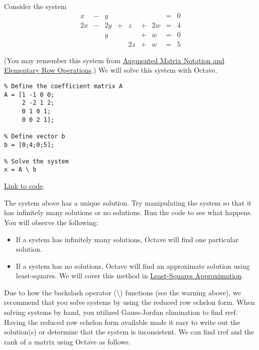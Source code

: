 \documentclass{ximera}
\begin{document}
\begin{template}\label{temp:systems1}
Consider the system
\begin{equation}
\begin{array}{ccccccccc}
      x &- &y&&&&&= &0 \\
	 2x& -&2y&+&z&+&2w&=&4\\
     & &y&&&+&w&=&0\\
     & &&&2z&+&w&=&5
    \end{array}
    \end{equation}

 (You may remember this system from \href{https://ximera.osu.edu/linearalgebrav3/LinearAlgebraInteractiveIntro/SYS-0020/main}{Augmented Matrix Notation and Elementary Row Operations}.)  We will solve this system with Octave.   
\begin{verbatim}
% Define the coefficient matrix A
A = [1 -1 0 0;
     2 -2 1 2;
     0 1 0 1;
     0 0 2 1];

% Define vector b
b = [0;4;0;5];

% Solve the system 
x = A \ b
\end{verbatim}

\href{https://sagecell.sagemath.org/?z=eJxFjsEKwjAQRO-B_Ye59FjYBD0FDwH_wGP1YMIGA7aBNpT69yZIcG-PeczsgKvEtAjKSxCyxJhCkqVgfpY1HXCkHC6YNEYNBltSaGcwGmiYzowW6z9yVfSjMqmhb-wSSl7hSfnWyfZk2Z67dMvv_ffH9tmKzCB1VM3hDv8FLh8nkA==&lang=octave&interacts=eJyLjgUAARUAuQ==}{Link to code}.

\begin{warning}
    The system above has a unique solution.  Try manipulating the system so that it has infinitely many solutions or no solutions.  Run the code to see what happens.  You will observe the following:

\begin{itemize}
    \item If a system has infinitely many solutions, Octave will find one particular solution.
    \item If a system has no solutions, Octave will find an approximate solution using least-squares.  We will cover this method in \href{https://ximera.osu.edu/linearalgebrav3/LinearAlgebraInteractiveIntro/RTH-0030/main}{Least-Squares Approximation}.
\end{itemize}
\end{warning}

\end{template}

Due to how the backslash operator ($\setminus$) functions (see the warning above), we recommend that you solve systems by using the reduced row echelon form.  When solving systems by hand, you utilized Gauss-Jordan elimination to find rref.  Having the reduced row echelon form available made it easy to write out the solution(s) or determine that the system is inconsistent.  We can find rref and the rank of a matrix using Octave as follows.
\end{document}
